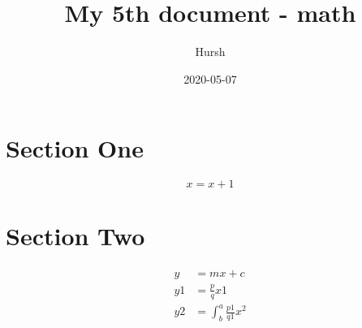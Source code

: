 \documentclass{article}
\title{My 5th document - math}
\date{2020-05-07}
\author{Hursh}
\begin{document}
\maketitle
{}
\newpage
{}
\section{Section One}
\begin{equation*}
x=x+1
\end{equation*}
\section{Section Two}
\begin{align*}
y&=mx+c\\
y1&=\frac{p}{q}x1\\
y2&=\int^a_b \frac{p1}{q1}x^2
\end{align*}
\end{document}
